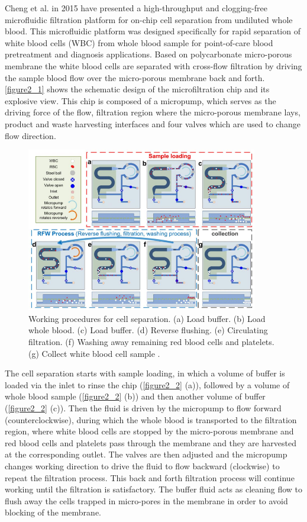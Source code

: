 Cheng et al. \cite{cheng2016high} in 2015 have presented a high-throughput and clogging-free microfluidic filtration platform for on-chip cell separation from undiluted whole blood. This microfluidic platform was designed specifically for rapid separation of white blood cells (WBC) from whole blood sample for point-of-care blood pretreatment and diagnosis applications. Based on polycarbonate micro-porous membrane the white blood cells are separated with cross-flow filtration by driving the sample blood flow over the micro-porous membrane back and forth. \autoref{figure2_1} shows the schematic design of the microfiltration chip and its explosive view. This chip is composed of a micropump, which serves as the driving force of the flow, filtration region where the micro-porous membrane lays, product and waste harvesting interfaces and four valves which are used to change flow direction.

\begin{figure}[ht]%
\centering
\includegraphics[width=0.9\textwidth]{figures/literaturereview/figure2_2}%
\caption{Working procedures for cell separation. (a) Load buffer. (b) Load whole blood. (c) Load buffer. (d) Reverse flushing. (e) Circulating filtration. (f) Washing away remaining red blood cells and platelets. (g) Collect white blood cell sample \cite{cheng2016high}.}%
\label{figure2_2}%
\end{figure}

The cell separation starts with sample loading, in which a volume of buffer is loaded via the inlet to rinse the chip (\autoref{figure2_2} (a)), followed by a volume of whole blood sample (\autoref{figure2_2} (b)) and then another volume of buffer (\autoref{figure2_2} (c)). Then the fluid is driven by the micropump to flow forward (counterclockwise), during which the whole blood is transported to the filtration region, where white blood cells are stopped by the micro-porous membrane and red blood cells and platelets pass through the membrane and they are harvested at the corresponding outlet. The valves are then adjusted and the micropump changes working direction to drive the fluid to flow backward (clockwise) to repeat the filtration process. This back and forth filtration process will continue working until the filtration is satisfactory. The buffer fluid acts as cleaning flow to flush away the cells trapped in micro-pores in the membrane in order to avoid blocking of the membrane.\\

